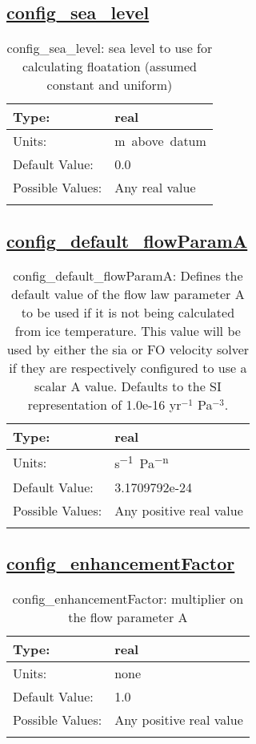 \subsection[config\_sea\_level]{\hyperref[sec:nm_tab_physical_parameters]{config\_sea\_level}}
\label{subsec:nm_sec_config_sea_level}
\begin{center}
\begin{longtable}{| p{2.0in} || p{4.0in} |}
    \hline
    Type: & real \\
    \hline
    Units: & \si{m.above.datum} \\
    \hline
    Default Value: & 0.0 \\
    \hline
    Possible Values: & Any real value \\
    \hline
    \caption{config\_sea\_level: sea level to use for calculating floatation (assumed constant and uniform)}
\end{longtable}
\end{center}
\subsection[config\_default\_flowParamA]{\hyperref[sec:nm_tab_physical_parameters]{config\_default\_flowParamA}}
\label{subsec:nm_sec_config_default_flowParamA}
\begin{center}
\begin{longtable}{| p{2.0in} || p{4.0in} |}
    \hline
    Type: & real \\
    \hline
    Units: & \si{s^{-1}.Pa^{-n}} \\
    \hline
    Default Value: & 3.1709792e-24 \\
    \hline
    Possible Values: & Any positive real value \\
    \hline
    \caption{config\_default\_flowParamA: Defines the default value of the flow law parameter A to be used if it is not being calculated from ice temperature.  This value will be used by either the sia or FO velocity solver if they are respectively configured to use a scalar A value.  Defaults to the SI representation of 1.0e-16 yr$^{-1}$ Pa$^{-3}$.}
\end{longtable}
\end{center}
\subsection[config\_enhancementFactor]{\hyperref[sec:nm_tab_physical_parameters]{config\_enhancementFactor}}
\label{subsec:nm_sec_config_enhancementFactor}
\begin{center}
\begin{longtable}{| p{2.0in} || p{4.0in} |}
    \hline
    Type: & real \\
    \hline
    Units: & \si{none} \\
    \hline
    Default Value: & 1.0 \\
    \hline
    Possible Values: & Any positive real value \\
    \hline
    \caption{config\_enhancementFactor: multiplier on the flow parameter A}
\end{longtable}
\end{center}
